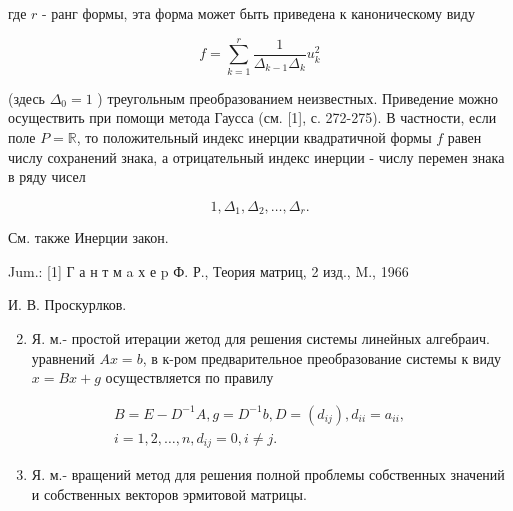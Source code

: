 \documentclass[10pt]{article}
\begin{document}
где $r$ - ранг формы, эта форма может быть приведена к каноническому виду



\[

f=\sum_{k=1}^{r} \frac{1}{\Delta_{k-1} \Delta_{k}} u_{k}^{2}

\]



(здесь $\Delta_{0}=1$ ) треугольным преобразованием неизвестных. Приведение можно осуществить при помощи метода Гаусса (см. [1], с. 272-275). В частности, если поле $P=\mathbb{R}$, то положительный индекс инерции квадратичной формы $f$ равен числу сохранений знака, а отрицательный индекс инерции - числу перемен знака в ряду чисел



\[

1, \Delta_{1}, \Delta_{2}, \ldots, \Delta_{r} .

\]



См. также Инерции закон.



Jum.: [1] Г а н т м a х е p Ф. Р., Теория матриц, 2 изд., M., 1966



И. В. Проскурлков.



\begin{enumerate}

  \setcounter{enumi}{1}

  \item Я. м.- простой итерации жетод для решения системы линейных алгебраич. уравнений $A x=b$, в к-ром предварительное преобразование системы к виду $x=B x+g$ осуществляется по правилу

\end{enumerate}



\[

\begin{gathered}

B=E-D^{-1} A, g=D^{-1} b, D=\left(d_{i j}\right), d_{i i}=a_{i i}, \\

i=1,2, \ldots, n, d_{i j}=0, i \neq j .

\end{gathered}

\]



\begin{enumerate}

  \setcounter{enumi}{2}

  \item Я. м.- вращений метод для решения полной проблемы собственных значений и собственных векторов эрмитовой матрицы.

\end{enumerate}
\end{document}
